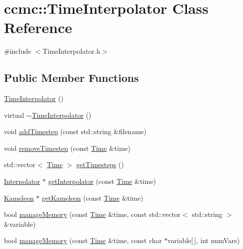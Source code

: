 \hypertarget{classccmc_1_1_time_interpolator}{\section{ccmc\-:\-:Time\-Interpolator Class Reference}
\label{classccmc_1_1_time_interpolator}
}


{\ttfamily \#include $<$Time\-Interpolator.\-h$>$}

\subsection*{Public Member Functions}
\begin{DoxyCompactItemize}
\item 
\hyperlink{classccmc_1_1_time_interpolator_a1c970e027859e2a0bb415e99427ae995}{Time\-Interpolator} ()
\item 
virtual \hyperlink{classccmc_1_1_time_interpolator_ade7807cb2a4e0916bd9014aca1bd0da6}{$\sim$\-Time\-Interpolator} ()
\item 
void \hyperlink{classccmc_1_1_time_interpolator_aaa61a9153116b891697833dfa46d16c9}{add\-Timestep} (const std\-::string \&filename)
\item 
void \hyperlink{classccmc_1_1_time_interpolator_ab8a45909a67aa7a59cca6aad8370f7f4}{remove\-Timestep} (const \hyperlink{classccmc_1_1_time}{Time} \&time)
\item 
std\-::vector$<$ \hyperlink{classccmc_1_1_time}{Time} $>$ \hyperlink{classccmc_1_1_time_interpolator_abaed778bc6352cb106dc0a1789a66ae7}{get\-Timesteps} ()
\item 
\hyperlink{classccmc_1_1_interpolator}{Interpolator} $\ast$ \hyperlink{classccmc_1_1_time_interpolator_a08c60c2162e8e4462c95566169678a13}{get\-Interpolator} (const \hyperlink{classccmc_1_1_time}{Time} \&time)
\item 
\hyperlink{classccmc_1_1_kameleon}{Kameleon} $\ast$ \hyperlink{classccmc_1_1_time_interpolator_a4464180e9cf07bdf490cc40a59102f81}{get\-Kameleon} (const \hyperlink{classccmc_1_1_time}{Time} \&time)
\item 
bool \hyperlink{classccmc_1_1_time_interpolator_a8fd3680bc1579890ea62c41145d5422f}{manage\-Memory} (const \hyperlink{classccmc_1_1_time}{Time} \&time, const std\-::vector$<$ std\-::string $>$ \&variable)
\item 
bool \hyperlink{classccmc_1_1_time_interpolator_a004a7a3560ca12234a43a481e6b56d07}{manage\-Memory} (const \hyperlink{classccmc_1_1_time}{Time} \&time, const char $\ast$variable\mbox{[}$\,$\mbox{]}, int num\-Vars)

\end{DoxyCompactItemize}
